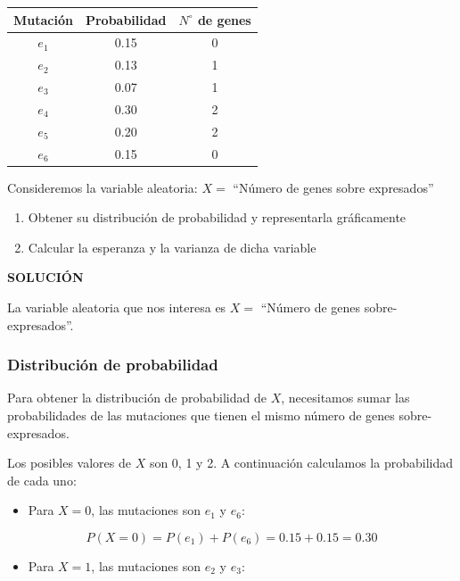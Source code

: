 \documentclass[
]{article}
\providecommand{\tightlist}{%
  \setlength{\itemsep}{0pt}\setlength{\parskip}{0pt}}
\begin{document}
\begin{longtable}[]{@{}ccc@{}}
\toprule\noalign{}
Mutación & Probabilidad & \(N^{\circ}\) de genes \\
\midrule\noalign{}
\endhead
\bottomrule\noalign{}
\endlastfoot
\(e_{1}\) & 0.15 & 0 \\
\(e_{2}\) & 0.13 & 1 \\
\(e_{3}\) & 0.07 & 1 \\
\(e_{4}\) & 0.30 & 2 \\
\(e_{5}\) & 0.20 & 2 \\
\(e_{6}\) & 0.15 & 0 \\
\end{longtable}

Consideremos la variable aleatoria: \(X=\) ``Número de genes sobre expresados''

\begin{enumerate}
\def\labelenumi{\arabic{enumi}.}
\item
  Obtener su distribución de probabilidad y representarla gráficamente
\item
  Calcular la esperanza y la varianza de dicha variable
\end{enumerate}

\textbf{SOLUCIÓN}

La variable aleatoria que nos interesa es \(X=\) ``Número de genes sobre-expresados''.

\subsubsection{Distribución de probabilidad}\label{distribuciuxf3n-de-probabilidad}

Para obtener la distribución de probabilidad de \(X\), necesitamos sumar las probabilidades de las mutaciones que tienen el mismo número de genes sobre-expresados.

Los posibles valores de \(X\) son 0, 1 y 2. A continuación calculamos la probabilidad de cada uno:

\begin{itemize}
\tightlist
\item
  Para \(X = 0\), las mutaciones son \(e_1\) y \(e_6\):
\end{itemize}

\[
P(X = 0) = P(e_1) + P(e_6) = 0.15 + 0.15 = 0.30
\]

\begin{itemize}
\tightlist
\item
  Para \(X = 1\), las mutaciones son \(e_2\) y \(e_3\):
\end{itemize}
\end{document}
